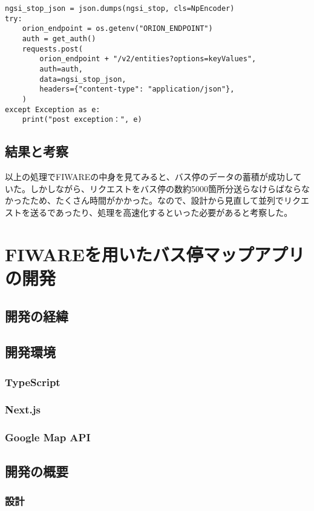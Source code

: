 \documentclass[a4paper, 12pt]{jsreport}
\begin{document}
\begin{enumerate}
\begin{screen}
\begin{verbatim}
ngsi_stop_json = json.dumps(ngsi_stop, cls=NpEncoder)
try:
    orion_endpoint = os.getenv("ORION_ENDPOINT")
    auth = get_auth()
    requests.post(
        orion_endpoint + "/v2/entities?options=keyValues",
        auth=auth,
        data=ngsi_stop_json,
        headers={"content-type": "application/json"},
    )
except Exception as e:
    print("post exception：", e)
    \end{verbatim}
      \end{screen}
  \end{enumerate}

  \section{結果と考察}
  \par
  以上の処理でFIWAREの中身を見てみると、バス停のデータの蓄積が成功していた。しかしながら、リクエストをバス停の数約5000箇所分送らなけらばならなかったため、たくさん時間がかかった。なので、設計から見直して並列でリクエストを送るであったり、処理を高速化するといった必要があると考察した。

  \chapter{FIWAREを用いたバス停マップアプリの開発}
  \section{開発の経緯}
  \section{開発環境}
  \subsection{TypeScript}
  \subsection{Next.js}
  \subsection{Google Map API}
  \section{開発の概要}
  \subsection{設計}
\end{document}
